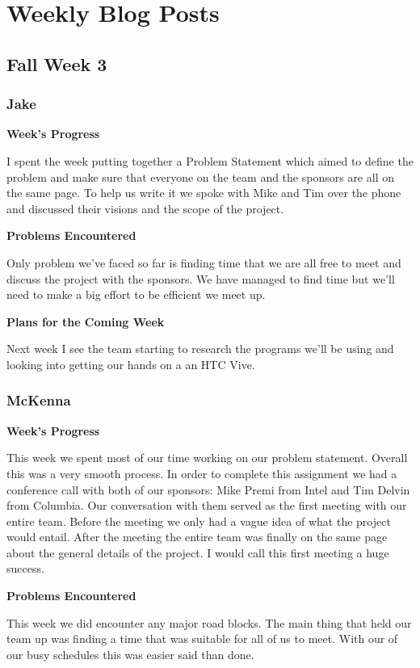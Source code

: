 \documentclass[10pt,journal,compsoc,onecolumn, draftclsnofoot]{IEEEtran}
\begin{document}
\section{Weekly Blog Posts}

\subsection{Fall Week 3}
\subsubsection{Jake}
\noindent \textbf{Week's Progress}

I spent the week putting together a Problem Statement which aimed to define the problem and make sure that everyone on the team and the sponsors are all on the same page. To help us write it we spoke with Mike and Tim over the phone and discussed their visions and the scope of the project.

\noindent \textbf{Problems Encountered}

Only problem we've faced so far is finding time that we are all free to meet and discuss the project with the sponsors. We have managed to find time but we'll need to make a big effort to be efficient we meet up.

\noindent \textbf{Plans for the Coming Week}

Next week I see the team starting to research the programs we'll be using and looking into getting our hands on a an HTC Vive.

\subsubsection{McKenna}
\noindent \textbf{Week's Progress}

This week we spent most of our time working on our problem statement. Overall this was a very smooth process. In order to complete this assignment we had a conference call with both of our sponsors: Mike Premi from Intel and Tim Delvin from Columbia. Our conversation with them served as the first meeting with our entire team. Before the meeting we only had a vague idea of what the project would entail. After the meeting the entire team was finally on the same page about the general details of the project. I would call this first meeting a huge success.

\noindent \textbf{Problems Encountered}

This week we did encounter any major road blocks. The main thing that held our team up was finding a time that was suitable for all of us to meet. With our of our busy schedules this was easier said than done.
\end{document}
